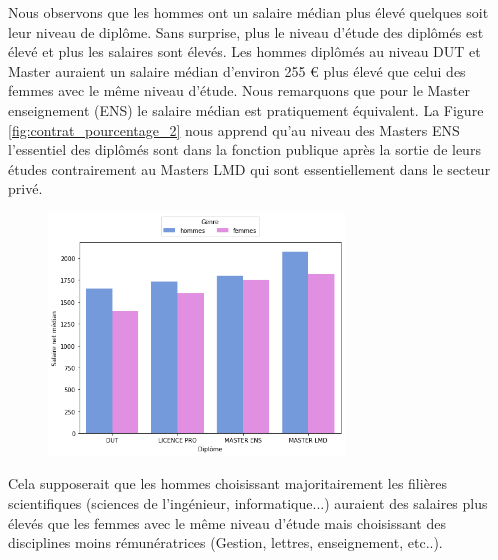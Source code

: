 \documentclass[12pt, a4paper, titlepage, table]{article}
\begin{document}
	
	
	Nous observons que les hommes ont un salaire médian plus élevé quelques soit leur niveau de diplôme.
	Sans surprise, plus le niveau d'étude des diplômés est élevé et plus les salaires sont élevés.
	Les hommes diplômés au niveau DUT et Master auraient un salaire médian d'environ 255 € plus élevé que celui des femmes avec le même niveau d'étude.
	Nous remarquons que pour le Master enseignement (ENS) le salaire médian est pratiquement équivalent.  
	La Figure \ref{fig:contrat_pourcentage_2} nous apprend qu'au niveau des Masters ENS l'essentiel des diplômés sont dans la fonction publique après la sortie de leurs études contrairement au Masters LMD qui sont essentiellement dans le secteur privé.
		
	\begin{figure}[H]
		\centering
		\includegraphics[width=0.7\textwidth]{../graphs/salaires_medians_genre.png}
		\label{fig:salaire_median_genre}
	\end{figure}
	Cela supposerait que les hommes choisissant majoritairement les filières scientifiques (sciences de l'ingénieur, informatique...) auraient des salaires plus élevés que les femmes avec le même niveau d'étude mais choisissant des disciplines moins rémunératrices (Gestion, lettres, enseignement, etc..).
	
\end{document}

